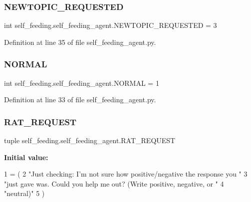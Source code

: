 \subsubsection{\texorpdfstring{N\+E\+W\+T\+O\+P\+I\+C\+\_\+\+R\+E\+Q\+U\+E\+S\+T\+ED}{NEWTOPIC\_REQUESTED}}
{\footnotesize\ttfamily int self\+\_\+feeding.\+self\+\_\+feeding\+\_\+agent.\+N\+E\+W\+T\+O\+P\+I\+C\+\_\+\+R\+E\+Q\+U\+E\+S\+T\+ED = 3}



Definition at line 35 of file self\+\_\+feeding\+\_\+agent.\+py.

\mbox{\label{namespaceself__feeding_1_1self__feeding__agent_a7b500190f7a4c2fed8b8f05d2f3b147c}} 
\subsubsection{\texorpdfstring{N\+O\+R\+M\+AL}{NORMAL}}
{\footnotesize\ttfamily int self\+\_\+feeding.\+self\+\_\+feeding\+\_\+agent.\+N\+O\+R\+M\+AL = 1}



Definition at line 33 of file self\+\_\+feeding\+\_\+agent.\+py.

\mbox{\label{namespaceself__feeding_1_1self__feeding__agent_a2e9f6a284c91b4eae4202280885eeac1}} 
\subsubsection{\texorpdfstring{R\+A\+T\+\_\+\+R\+E\+Q\+U\+E\+ST}{RAT\_REQUEST}}
{\footnotesize\ttfamily tuple self\+\_\+feeding.\+self\+\_\+feeding\+\_\+agent.\+R\+A\+T\+\_\+\+R\+E\+Q\+U\+E\+ST}

{\bfseries Initial value\+:}
\begin{DoxyCode}
1 =  (
2     \textcolor{stringliteral}{"Just checking: I'm not sure how positive/negative the response you "}
3     \textcolor{stringliteral}{"just gave was. Could you help me out? (Write positive, negative, or "}
4     \textcolor{stringliteral}{"neutral)"}
5 )
\end{DoxyCode}


